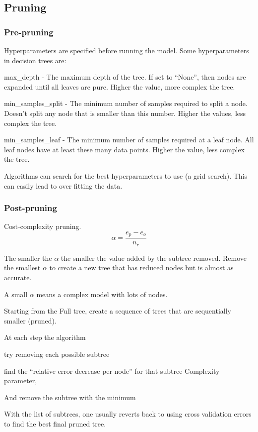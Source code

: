 	\subsection{Pruning}
	\subsubsection{Pre-pruning}
Hyperparameters are specified before running the model.  Some hyperparameters in decision trees are:
	\begin{bulletedlist}
		\item max\_depth - The maximum depth of the tree. If set to ``None'', then nodes are expanded until all leaves are pure. Higher the value, more complex the tree.
		\item min\_samples\_split - The minimum number of samples required to split a node. Doesn't split any node that is smaller than this number. Higher the values, less complex the tree.
		\item min\_samples\_leaf - The minimum number of samples required at a leaf node. All leaf nodes have at least these many data points. Higher the value, less complex the tree.
	\end{bulletedlist}

Algorithms can search for the best hyperparameters to use (a grid search).  This can easily lead to over fitting the data.

	\subsubsection{Post-pruning}
Cost-complexity pruning.
	\begin{equation}
		\alpha = \frac{e_p - e_o}{n_r}
	\end{equation}
	\begin{mathwhere}[0.4in]
	\end{mathwhere}
The smaller the $\alpha$ the smaller the value added by the subtree removed.  Remove the smallest $\alpha$ to create a new tree that has reduced nodes but is almost as accurate.

A small $\alpha$ means a complex model with lots of nodes.

	\begin{bulletedlist}
		\item Starting from the Full tree, create a sequence of trees that are sequentially smaller (pruned).
		\item At each step the algorithm
		\item try removing each possible subtree
		\item find the ``relative error decrease per node'' for that subtree Complexity parameter,
		\item And remove the subtree with the minimum
		\item With the list of subtrees, one usually reverts back to using cross validation errors to find the best final pruned tree.
	\end{bulletedlist}

